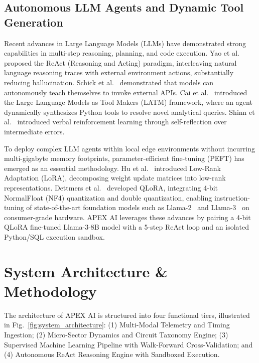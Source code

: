 \documentclass[journal]{IEEEtran}
\begin{document}
\subsection{Autonomous LLM Agents and Dynamic Tool Generation}
Recent advances in Large Language Models (LLMs) have demonstrated strong capabilities in multi-step reasoning, planning, and code execution. Yao et al.~\cite{yao2022react} proposed the ReAct (Reasoning and Acting) paradigm, interleaving natural language reasoning traces with external environment actions, substantially reducing hallucination. Schick et al.~\cite{schick2023toolformer} demonstrated that models can autonomously teach themselves to invoke external APIs. Cai et al.~\cite{cai2023latm} introduced the Large Language Models as Tool Makers (LATM) framework, where an agent dynamically synthesizes Python tools to resolve novel analytical queries. Shinn et al.~\cite{shinn2023reflexion} introduced verbal reinforcement learning through self-reflection over intermediate errors.

To deploy complex LLM agents within local edge environments without incurring multi-gigabyte memory footprints, parameter-efficient fine-tuning (PEFT) has emerged as an essential methodology. Hu et al.~\cite{hu2022lora} introduced Low-Rank Adaptation (LoRA), decomposing weight update matrices into low-rank representations. Dettmers et al.~\cite{dettmers2022llmint8, dettmers2023qlora} developed QLoRA, integrating 4-bit NormalFloat (NF4) quantization and double quantization, enabling instruction-tuning of state-of-the-art foundation models such as Llama-2~\cite{touvron2023llama2} and Llama-3~\cite{dubey2024llama3} on consumer-grade hardware. APEX AI leverages these advances by pairing a 4-bit QLoRA fine-tuned Llama-3-8B model with a 5-step ReAct loop and an isolated Python/SQL execution sandbox.

\section{System Architecture \& Methodology}
\label{sec:architecture}
The architecture of APEX AI is structured into four functional tiers, illustrated in Fig.~\ref{fig:system_architecture}: (1) Multi-Modal Telemetry and Timing Ingestion; (2) Micro-Sector Dynamics and Circuit Taxonomy Engine; (3) Supervised Machine Learning Pipeline with Walk-Forward Cross-Validation; and (4) Autonomous ReAct Reasoning Engine with Sandboxed Execution.
\end{document}
